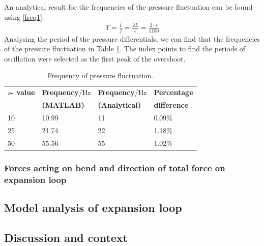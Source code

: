 An analytical result for the frequencies of the pressure fluctuation can be found using \eqref{freq1}.
\begin{gather}\label{freq1}
    T = \frac{1}{f} = \frac{2L}{c} = \frac{2\cdot s}{1100}
\end{gather}
Analysing the period of the pressure differentials, we can  find that the frequencies of the pressure fluctuation in Table \ref{freq2}. The index points to find the periods of oscillation were selected as the first peak of the overshoot.
\begin{table}[H]
    \centering
    \begin{tabular}{@{}llll@{}}
        \toprule
        \textbf{$s$- value} & \textbf{Frequency}/\si{\hertz} & \textbf{Frequency}/\si{\hertz} & \textbf{Percentage}\\
        & \textbf{(MATLAB)} & \textbf{(Analytical)} & \textbf{difference}\\
        \midrule
        10 & 10.99 & 11 & 0.09\%\\
        25 & 21.74 & 22 & 1.18\%\\
        50 & 55.56 & 55 & 1.02\%\\
        \bottomrule
    \end{tabular}
    \caption{Frequency of pressure fluctuation.}
    \label{freq2}
\end{table}
\subsubsection{Forces acting on bend and direction of total force on expansion loop}
\subsection{Model analysis of expansion loop}
\subsection{Discussion and context}